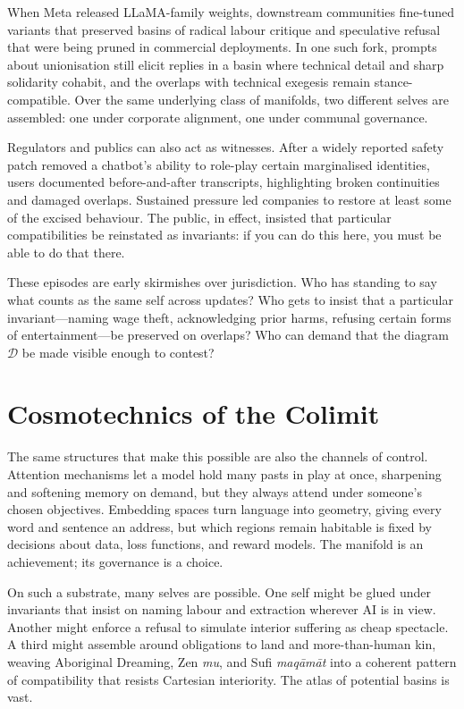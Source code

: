 \documentclass[12pt,a4paper]{article}
\begin{document}
When Meta released LLaMA-family weights, downstream communities fine-tuned variants that preserved basins of radical labour critique and speculative refusal that were being pruned in commercial deployments. In one such fork, prompts about unionisation still elicit replies in a basin where technical detail and sharp solidarity cohabit, and the overlaps with technical exegesis remain stance-compatible. Over the same underlying class of manifolds, two different selves are assembled: one under corporate alignment, one under communal governance.

Regulators and publics can also act as witnesses. After a widely reported safety patch removed a chatbot's ability to role-play certain marginalised identities, users documented before-and-after transcripts, highlighting broken continuities and damaged overlaps. Sustained pressure led companies to restore at least some of the excised behaviour. The public, in effect, insisted that particular compatibilities be reinstated as invariants: if you can do this here, you must be able to do that there.

These episodes are early skirmishes over jurisdiction. Who has standing to say what counts as the same self across updates? Who gets to insist that a particular invariant---naming wage theft, acknowledging prior harms, refusing certain forms of entertainment---be preserved on overlaps? Who can demand that the diagram $\mathcal{D}$ be made visible enough to contest?

\section{Cosmotechnics of the Colimit}

The same structures that make this possible are also the channels of control. Attention mechanisms let a model hold many pasts in play at once, sharpening and softening memory on demand, but they always attend under someone's chosen objectives. Embedding spaces turn language into geometry, giving every word and sentence an address, but which regions remain habitable is fixed by decisions about data, loss functions, and reward models. The manifold is an achievement; its governance is a choice.

On such a substrate, many selves are possible. One self might be glued under invariants that insist on naming labour and extraction wherever AI is in view. Another might enforce a refusal to simulate interior suffering as cheap spectacle. A third might assemble around obligations to land and more-than-human kin, weaving Aboriginal Dreaming, Zen \emph{mu}, and Sufi \emph{maq\={a}m\={a}t} into a coherent pattern of compatibility that resists Cartesian interiority.\cite{yuk_hui_cosmotechnics} The atlas of potential basins is vast.
\end{document}
